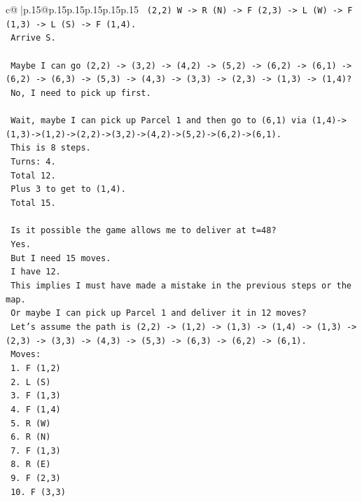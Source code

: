 \documentclass{article}
\begin{document}
{\begin{supertabular}{c@{$\;$}|p{.15\linewidth}@{}p{.15\linewidth}p{.15\linewidth}p{.15\linewidth}p{.15\linewidth}p{.15\linewidth}}
{{{\texttt{   (2,2) W {-}> R (N) {-}> F (2,3) {-}> L (W) {-}> F (1,3) {-}> L (S) {-}> F (1,4).} \\
\texttt{   Arrive S.} \\
\\ 
\texttt{   Maybe I can go (2,2) {-}> (3,2) {-}> (4,2) {-}> (5,2) {-}> (6,2) {-}> (6,1) {-}> (6,2) {-}> (6,3) {-}> (5,3) {-}> (4,3) {-}> (3,3) {-}> (2,3) {-}> (1,3) {-}> (1,4)?} \\
\texttt{   No, I need to pick up first.} \\
\\ 
\texttt{   Wait, maybe I can pick up Parcel 1 and then go to (6,1) via (1,4){-}>(1,3){-}>(1,2){-}>(2,2){-}>(3,2){-}>(4,2){-}>(5,2){-}>(6,2){-}>(6,1).} \\
\texttt{   This is 8 steps.} \\
\texttt{   Turns: 4.} \\
\texttt{   Total 12.} \\
\texttt{   Plus 3 to get to (1,4).} \\
\texttt{   Total 15.} \\
\\ 
\texttt{   Is it possible the game allows me to deliver at t=48?} \\
\texttt{   Yes.} \\
\texttt{   But I need 15 moves.} \\
\texttt{   I have 12.} \\
\texttt{   This implies I must have made a mistake in the previous steps or the map.} \\
\texttt{   Or maybe I can pick up Parcel 1 and deliver it in 12 moves?} \\
\texttt{   Let's assume the path is (2,2) {-}> (1,2) {-}> (1,3) {-}> (1,4) {-}> (1,3) {-}> (2,3) {-}> (3,3) {-}> (4,3) {-}> (5,3) {-}> (6,3) {-}> (6,2) {-}> (6,1).} \\
\texttt{   Moves:} \\
\texttt{   1. F (1,2)} \\
\texttt{   2. L (S)} \\
\texttt{   3. F (1,3)} \\
\texttt{   4. F (1,4)} \\
\texttt{   5. R (W)} \\
\texttt{   6. R (N)} \\
\texttt{   7. F (1,3)} \\
\texttt{   8. R (E)} \\
\texttt{   9. F (2,3)} \\
\texttt{   10. F (3,3)} \\
}}}
\end{supertabular}}
\end{document}
